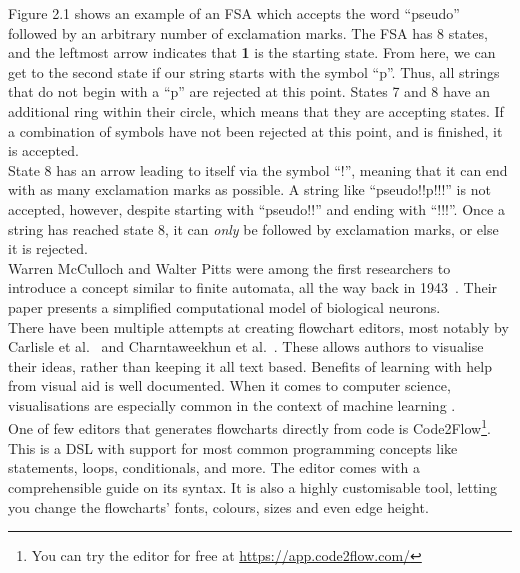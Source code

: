 Figure 2.1 shows an example of an FSA which accepts the word ``pseudo'' followed by an arbitrary number of exclamation marks. The FSA has 8 states, and the leftmost arrow indicates that \textbf{1} is the starting state. From here, we can get to the second state if our string starts with the symbol ``p''. Thus, all strings that do not begin with a ``p'' are rejected at this point. States 7 and 8 have an additional ring within their circle, which means that they are accepting states. If a combination of symbols have not been rejected at this point, and is finished, it is accepted. \hfill \\

State 8 has an arrow leading to itself via the symbol ``!'', meaning that it can end with as many exclamation marks as possible. A string like ``pseudo!!p!!!'' is not accepted, however, despite starting with ``pseudo!!'' and ending with ``!!!''. Once a string has reached state 8, it can \textit{only} be followed by exclamation marks, or else it is rejected. \hfill \\

Warren McCulloch and Walter Pitts were among the first researchers to introduce a concept similar to finite automata, all the way back in 1943~\cite{McCulloch43}. Their paper presents a simplified computational model of biological neurons. \hfill \\

There have been multiple attempts at creating flowchart editors, most notably by Carlisle et al.~\cite{carlisle2004} and Charntaweekhun et al.~\cite{charntaweekhun2006}. These allows authors to visualise their ideas, rather than keeping it all text based. Benefits of learning with help from visual aid is well documented. When it comes to computer science, visualisations are especially common in the context of machine learning \cite{ML_Visual1, ML_Visual2, ML_Visual3}. \hfill \\

One of few editors that generates flowcharts directly from code is Code2Flow\footnote{You can try the editor for free at \url{https://app.code2flow.com/}}. This is a DSL with support for most common programming concepts like statements, loops, conditionals, and more. The editor comes with a comprehensible guide on its syntax. It is also a highly customisable tool, letting you change the flowcharts' fonts, colours, sizes and even edge height. \hfill \\

